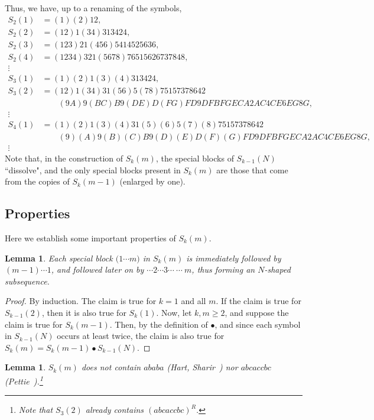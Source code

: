 \documentclass[11pt]{article}
\newtheorem{lemma}[theorem]{Lemma}
\theoremstyle{definition}
\theoremstyle{remark}
\begin{document}
Thus, we have, up to a renaming of the symbols,
\begin{align*}
S_2(1) &= (1)(2)12,\\
S_2(2) &= (12)1(34)313424,\\
S_2(3) &= (123)21(456)5414525636,\\
S_2(4) &= (1234)321(5678)76515626737848,\\
\vdots\\
S_3(1) &= (1)(2)1(3)(4)313424,\\
S_3(2) &= (12)1(34)31(56)5(78)75157378642\\
&\qquad(9A)9(BC)B9(DE)D(FG)FD9DFBFGECA2AC4CE6EG8G,\\
\vdots\\
S_4(1) &= (1)(2)1(3)(4)31(5)(6)5(7)(8)75157378642\\
&\qquad(9)(A)9(B)(C)B9(D)(E)D(F)(G)FD9DFBFGECA2AC4CE6EG8G,\\
\vdots
\end{align*}
Note that, in the construction of $S_k(m)$, the special blocks of $S_{k-1}(N)$ ``dissolve", and the only special blocks present in $S_k(m)$ are those that come from the copies of $S_k(m-1)$ (enlarged by one).

\subsection{Properties}

Here we establish some important properties of $S_k(m)$.

\begin{lemma}\label{lemma_SB_N}
Each special block $\bigl(1\cdots m\bigr)$ in $S_k(m)$ is immediately followed by $(m-1)\cdots 1$, and followed later on by $\cdots 2\cdots 3\cdots\ \cdots\ m$, thus forming an $N$-shaped subsequence.
\end{lemma}

\begin{proof}
By induction. The claim is true for $k=1$ and all $m$. If the claim is true for $S_{k-1}(2)$, then it is also true for $S_k(1)$. Now, let $k,m\ge 2$, and suppose the claim is true for $S_k(m-1)$. Then, by the definition of $\bullet$, and since each symbol in $S_{k-1}(N)$ occurs at least twice, the claim is also true for $S_k(m) = S_k(m-1) \bullet S_{k-1}(N)$.
\end{proof}

\begin{lemma}
$S_k(m)$ does not contain $ababa$ (Hart, Sharir~\cite{HS}) nor $abcaccbc$ (Pettie~\cite{pettie_origins}).\footnote{Note that $S_3(2)$ already contains $(abcaccbc)^R$.}
\end{lemma}
\end{document}
